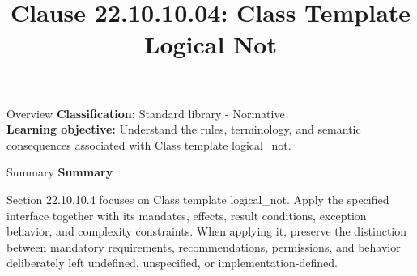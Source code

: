 \documentclass[10pt,letterpaper]{article}
\title{Clause 22.10.10.04: Class Template Logical Not}
\author{}
\date{}
\begin{document}
\maketitle
\begin{CornellOverviewBox}{Overview}
\textbf{Classification:} Standard library - Normative\\[2pt]
\textbf{Learning objective:} Understand the rules, terminology, and semantic consequences associated with Class template logical\_not.
\end{CornellOverviewBox}\begin{CornellSummaryBox}{Summary}
{\sffamily\bfseries\color{Accent} Summary}\par\vspace{3pt}Section 22.10.10.4 focuses on Class template logical\_not. Apply the specified interface together with its mandates, effects, result conditions, exception behavior, and complexity constraints. When applying it, preserve the distinction between mandatory requirements, recommendations, permissions, and behavior deliberately left undefined, unspecified, or implementation-defined.
\end{CornellSummaryBox}
\end{document}
